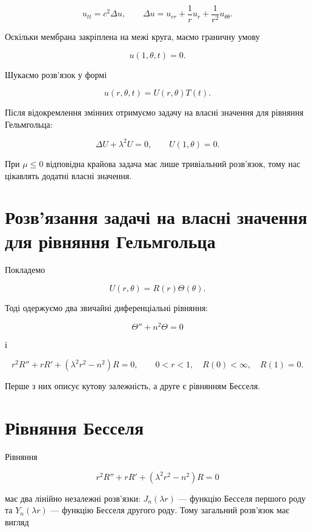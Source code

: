 \documentclass[
  ukrainian,
]{article}
\begin{document}
\[u_{tt}=c^2\Delta u,\qquad\Delta u=u_{rr}+\frac{1}{r}u_r+\frac{1}{r^2}u_{\theta\theta}.\]

Оскільки мембрана закріплена на межі круга, маємо граничну умову

\[u(1,\theta,t)=0.\]

Шукаємо розв'язок у формі

\[u(r,\theta,t)=U(r,\theta)T(t).\]

Після відокремлення змінних отримуємо задачу на власні значення для
рівняння Гельмгольца:

\[\Delta U+\lambda^2U=0,\qquad U(1,\theta)=0.\]

При \(\mu\le 0\) відповідна крайова задача має лише тривіальний
розв'язок, тому нас цікавлять додатні власні значення.

\section{Розв'язання задачі на власні значення для рівняння
Гельмгольца}\label{ux440ux43eux437ux432ux44fux437ux430ux43dux43dux44f-ux437ux430ux434ux430ux447ux456-ux43dux430-ux432ux43bux430ux441ux43dux456-ux437ux43dux430ux447ux435ux43dux43dux44f-ux434ux43bux44f-ux440ux456ux432ux43dux44fux43dux43dux44f-ux433ux435ux43bux44cux43cux433ux43eux43bux44cux446ux430}

Покладемо

\[U(r,\theta)=R(r)\Theta(\theta).\]

Тоді одержуємо два звичайні диференціальні рівняння:

\[\Theta''+n^2\Theta=0\]

і

\[r^2R''+rR'+(\lambda^2r^2-n^2)R=0,\qquad 0<r<1,\quad R(0)<\infty,\quad R(1)=0.\]

Перше з них описує кутову залежність, а друге є рівнянням Бесселя.

\section{Рівняння
Бесселя}\label{ux440ux456ux432ux43dux44fux43dux43dux44f-ux431ux435ux441ux441ux435ux43bux44f}

Рівняння

\[r^2R''+rR'+(\lambda^2r^2-n^2)R=0\]

має два лінійно незалежні розв'язки: \(J_n(\lambda r)\) --- функцію
Бесселя першого роду та \(Y_n(\lambda r)\) --- функцію Бесселя другого
роду. Тому загальний розв'язок має вигляд
\end{document}
